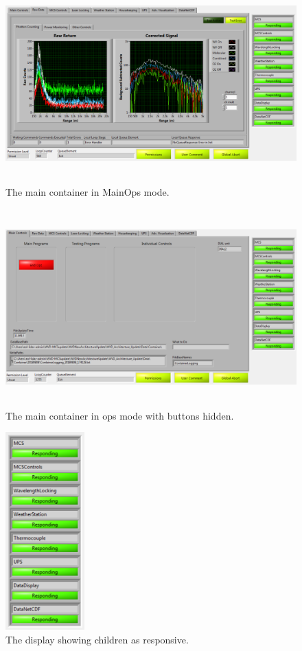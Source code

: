 \begin{figure}[!ht]\centering
\includegraphics[height=3in]{Figures/MainOps}
\caption{The main container in MainOps mode.}
\label{Fig-MainOpsContainer}
\end{figure}

\begin{figure}[!ht]\centering
\includegraphics[height=3in]{Figures/MainOpsButtons}
\caption{The main container in ops mode with buttons hidden.}
\label{Fig-ContainerButtons}
\end{figure}

\begin{figure}[!ht]\centering
\includegraphics[height=3in]{Figures/RespondingReadout}
\caption{The display showing children as responsive.}
\label{Fig-Responsive}
\end{figure}

\newpage 
